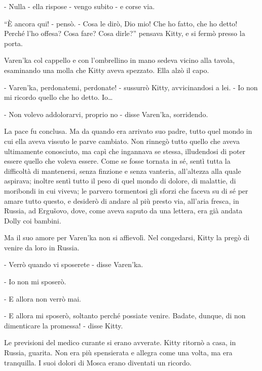 - Nulla - ella rispose - vengo subito - e corse via. 

``È ancora qui! - pensò. - Cosa le dirò, Dio mio! Che ho fatto, che ho detto! Perché l'ho offesa? Cosa fare? Cosa dirle?'' pensava Kitty, e si fermò presso la porta. 

Varen'ka col cappello e con l'ombrellino in mano sedeva vicino alla tavola, esaminando una molla che Kitty aveva spezzato. Ella alzò il capo. 

- Varen'ka, perdonatemi, perdonate! - sussurrò Kitty, avvicinandosi a lei. - Io non mi ricordo quello che ho detto. Io\ldots{} 

- Non volevo addolorarvi, proprio no - disse Varen'ka, sorridendo. 

La pace fu conclusa. Ma da quando era arrivato suo padre, tutto quel mondo in cui ella aveva vissuto le parve cambiato. Non rinnegò tutto quello che aveva ultimamente conosciuto, ma capì che ingannava se stessa, illudendosi di poter essere quello che voleva essere. Come se fosse tornata in sé, sentì tutta la difficoltà di mantenersi, senza finzione e senza vanteria, all'altezza alla quale aspirava; inoltre sentì tutto il peso di quel mondo di dolore, di malattie, di moribondi in cui viveva; le parvero tormentosi gli sforzi che faceva su di sé per amare tutto questo, e desiderò di andare al più presto via, all'aria fresca, in Russia, ad Ergušovo, dove, come aveva saputo da una lettera, era già andata Dolly coi bambini. 

Ma il suo amore per Varen'ka non si affievolì. Nel congedarsi, Kitty la pregò di venire da loro in Russia. 

- Verrò quando vi sposerete - disse Varen'ka. 

- Io non mi sposerò. 

- E allora non verrò mai. 

- E allora mi sposerò, soltanto perché possiate venire. Badate, dunque, di non dimenticare la promessa! - disse Kitty. 

Le previsioni del medico curante si erano avverate. Kitty ritornò a casa, in Russia, guarita. Non era più spensierata e allegra come una volta, ma era tranquilla. I suoi dolori di Mosca erano diventati un ricordo. 
